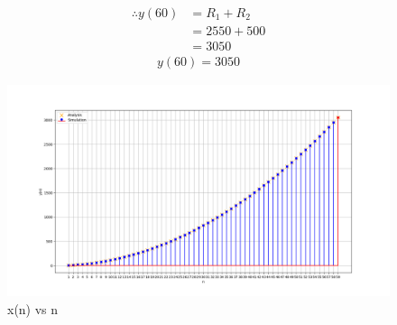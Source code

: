 \documentclass[journal,12pt,twocolumn]{IEEEtran}
\begin{document}
	\begin{align}
		\therefore y(60)&= R_1 + R_2 \\
		 &= 2550 + 500\\
		 &= 3050
	\end{align}
	\begin{align}
		\boxed{y(60)=3050}
	\end{align}
	\begin{figure}[ht]
		\includegraphics[width = \linewidth]{figs/fig1}
		\caption{x(n) vs n}
		\centering
		\label{fig: fig1}
	\end{figure}
\end{document}
